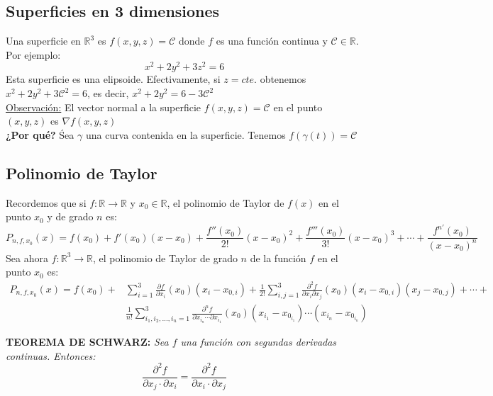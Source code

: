 \documentclass[11pt]{article}
\newcommand{\R}{\mathbb{R}}
\theoremstyle{plain}
\begin{document}
        \subsection{Superficies en 3 dimensiones} %
        \label{sub:superficies_en_3_dimensiones}
            Una superficie en $\R^3$ es $f(x,y,z) = \mathcal{C}$ donde $f$ es una función continua y $\mathcal{C} \in \R$. Por ejemplo: 
            \[x^2+2y^2+3z^2 = 6\]
            Esta superficie es una elipsoide. Efectivamente, si $z=cte.$ obtenemos $x^2+2y^2+3\mathcal{C}^2 = 6$, es decir, $x^2+2y^2 = 6-3\mathcal{C}^2$\\
            \underline{Observación:} El vector normal a la superficie $f(x,y,z)=\mathcal{C}$ en el punto $(x,y,z)$ es $\nabla f(x,y,z)$\\
            \textbf{¿Por qué?} Śea $\gamma$ una curva contenida en la superficie. Tenemos $f(\gamma(t)) = \mathcal{C}$
        \subsection{Polinomio de Taylor} %
        \label{sub:polinomio_de_taylor}
            Recordemos que si $f:\R \rightarrow \R$ y $x_0 \in \R$, el polinomio de Taylor de $f(x)$ en el punto $x_0$ y de grado $n$ es:
            \[P_{n,f,x_0} (x) = f(x_0) + f'(x_0) (x-x_0) + \frac{f''(x_0)}{2!}(x-x_0)^2 + \frac{f'''(x_0)}{3!}(x-x_0)^3 + \cdots + \frac{f^{n'}(x_0)}{(x-x_0)^n}\]
            Sea ahora $f:\R^3 \rightarrow \R$, el polinomio de Taylor de grado $n$ de la función $f$ en el punto $x_0$ es:
            \begin{align}
                P_{n,f,x_0}(x) = f(x_0) + & \sum_{i=1}^3 \frac{\partial f}{\partial x_i}(x_0)(x_i-x_{0,i}) + \frac{1}{2!} \sum_{i,j=1}^{3} \frac{\partial^2 f}{\partial x_i\partial x_j}(x_0) (x_i-x_{0,i})(x_j-x_{0,j})+ \cdots + \nonumber \\
                &  \frac{1}{n!} \sum_{i_1,i_2,...,i_n = 1}^{3} \frac{\partial^n f}{\partial x_{i_n} \cdots \partial x_{i_1}}(x_0)(x_{i_1} -x_{0_{i_1}})\cdots(x_{i_n}-x_{0_{i_n}})
            \end{align}

            \textbf{TEOREMA DE SCHWARZ:} \textit{Sea $f$ una función con segundas derivadas continuas. Entonces:}
            \[\frac{\partial^2f}{\partial x_j \cdot\partial x_i } = \frac{\partial^2f}{\partial x_i \cdot\partial x_j }\]
\end{document}
